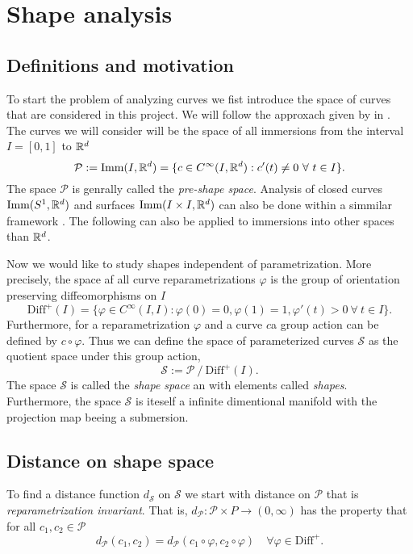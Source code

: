 
\section{Shape analysis}
\subsection{Definitions and motivation}
To start the problem of analyzing curves we fist introduce the space of curves that are considered in this project. We will follow the approxach given by \citeauthor[]{bauer2015why} in \cite{bauer2015why}. The curves we will consider will be the space of all immersions from the interval  \(I = [0, 1]\) to  \(\mathbb{R}^d\)
\begin{equation}
  \mathcal{P}:= \text{Imm}(I, \mathbb{R}^d) = \{c \in C^{\infty}(I, \mathbb{R}^d) :  c'(t) \neq  0 \ \forall \ t \in I  \}.
\end{equation}
The space \(\mathcal{P}\) is genrally called the \emph{pre-shape space}. Analysis of closed curves \(\text{Imm}(S^1, \mathbb{R}^d)\) and surfaces \(\text{Imm}(I \times I, \mathbb{R}^d)\) can also be done within a simmilar framework \cite{bauer2014overview}.
The following can also be applied to immersions into other spaces than \(\mathbb{R}^d\).

Now we would like to study shapes independent of parametrization. More precisely, the space af all curve reparametrizations   \(\varphi\) is the group of orientation preserving diffeomorphisms on  \(I\)
\begin{equation}
  \text{Diff}^+(I) = \{\varphi \in C^{\infty}(I,I): \varphi(0) = 0, \varphi(1) = 1, \varphi'(t) > 0 \ \forall \ t \in I \}.
\end{equation}
Furthermore, for a reparametrization  \(\varphi \) and a curve  \(c\)a group action can be defined by  \(c \circ \varphi\). Thus we can define the space of parameterized curves \(\mathcal{S}\) as the quotient space under this group action,
\begin{equation}
  \mathcal{S} := \mathcal{P} \ / \ {\text{Diff}^+(I)}.
\end{equation}
The space  \(\mathcal{S}\) is called the \emph{shape space} an with elements called \emph{shapes}. Furthermore, the space \(\mathcal{S}\) is iteself a infinite dimentional manifold with the projection map beeing a submersion. 

\subsection{Distance on shape space}
To find a distance function \(d_{\mathcal{S}}\) on \(\mathcal{S}\) we start with distance on \(\mathcal{\mathcal{P}}\) that is \emph{reparametrization invariant}. That is, \(d_\mathcal{P} : \mathcal{P} \times P \rightarrow (0, \infty)\) has the property that for all  \(c_1, c_2 \in \mathcal{P}\)
\begin{equation}
  d_{\mathcal{P}}(c_1, c_2)=d_{\mathcal{P}}(c_1 \circ \varphi, c_2\circ \varphi) \quad \forall \varphi \in \text{Diff}^+.
\end{equation}

